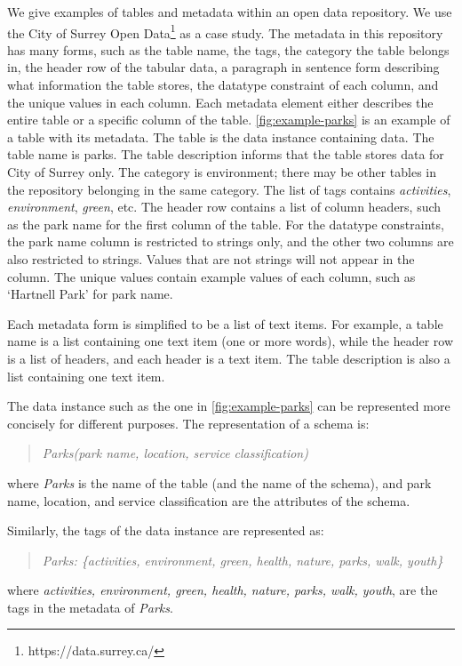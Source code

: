 We give examples of tables and metadata within an open data repository. We use the City of Surrey Open Data\footnote{https://data.surrey.ca/} as a case study. The metadata in this repository has many forms, such as the table name, the tags, the category the table belongs in, the header row of the tabular data, a paragraph in sentence form describing what information the table stores, the datatype constraint of each column, and the unique values in each column. Each metadata element either describes the entire table or a specific column of the table. \autoref{fig:example-parks} is an example of a table with its metadata. The table is the data instance containing data. The table name is parks. The table description informs that the table stores data for City of Surrey only. The category is environment; there may be other tables in the repository belonging in the same category. The list of tags contains \textit{activities}, \textit{environment}, \textit{green}, etc. The header row contains a list of column headers, such as the park name for the first column of the table. For the datatype constraints, the park name column is restricted to strings only, and the other two columns are also restricted to strings. Values that are not strings will not appear in the column. The unique values contain example values of each column, such as `Hartnell Park' for park name.

Each metadata form is simplified to be a list of text items. For example, a table name is a list containing one text item (one or more words), while the header row is a list of headers, and each header is a text item. The table description is also a list containing one text item.

The data instance such as the one in \autoref{fig:example-parks} can be represented more concisely for different purposes. The representation of a schema is:
\begin{quote}
\textit{Parks(park name, location, service classification)}
\end{quote}
where \textit{Parks} is the name of the table (and the name of the schema), and park name, location, and service classification are the attributes of the schema.

Similarly, the tags of the data instance are represented as:
\begin{quote}
\textit{Parks: \{activities, environment, green, health, nature, parks, walk, youth\}}
\end{quote}
where \textit{activities, environment, green, health, nature, parks, walk, youth}, are the tags in the metadata of \textit{Parks}.

